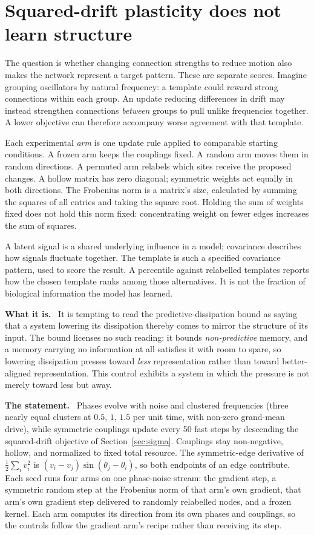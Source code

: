 \documentclass[11pt]{article}
\newcommand{\what}{\par\smallskip\noindent\textbf{What it is.}\ }
\newcommand{\statement}{\par\smallskip\noindent\textbf{The statement.}\ }
\begin{document}
\section{Squared-drift plasticity does not learn structure}
\label{sec:plasticity}

The question is whether changing connection strengths to reduce motion also
makes the network represent a target pattern. These are separate scores.
Imagine grouping oscillators by natural frequency: a template could reward
strong connections within each group. An update reducing differences in drift
may instead strengthen connections \emph{between} groups to pull unlike
frequencies together. A lower objective can therefore accompany worse
agreement with that template.

Each experimental \emph{arm} is one update rule applied to comparable starting
conditions. A frozen arm keeps the couplings fixed. A random arm moves them in
random directions. A permuted arm relabels which sites receive the proposed
changes. A hollow matrix has zero diagonal; symmetric weights act equally in
both directions. The Frobenius norm is a matrix's size, calculated by summing
the squares of all entries and taking the square root. Holding the sum of
weights fixed does not hold this norm fixed: concentrating weight on fewer
edges increases the sum of squares.

A latent signal is a shared underlying influence in a model; covariance
describes how signals fluctuate together. The template is such a specified
covariance pattern, used to score the result. A percentile against relabelled
templates reports how the chosen template ranks among those alternatives.
It is not the fraction of biological information the model has learned.

\what
It is tempting to read the predictive-dissipation bound as saying that a system
lowering its dissipation thereby comes to mirror the structure of its input.
The bound licenses no such reading: it bounds \emph{non-predictive} memory, and
a memory carrying no information at all satisfies it with room to spare, so
lowering dissipation presses toward \emph{less} representation rather than
toward better-aligned representation. This control exhibits a system in which
the pressure is not merely toward less but away.

\statement
Phases evolve with noise and clustered frequencies (three nearly equal clusters
at $0.5$, $1$, $1.5$ per unit time, with non-zero grand-mean drive), while
symmetric couplings update every 50 fast steps by descending the squared-drift
objective of Section~\ref{sec:sigma}. Couplings stay non-negative, hollow, and
normalized to fixed total resource. The symmetric-edge derivative of
$\tfrac12\sum_i v_i^2$ is $(v_i-v_j)\sin(\theta_j-\theta_i)$, so both endpoints
of an edge contribute. Each seed runs four arms on one phase-noise stream: the
gradient step, a symmetric random step at the Frobenius norm of that arm's own
gradient, that arm's own gradient step delivered to randomly relabelled nodes,
and a frozen kernel. Each arm computes its direction from its own phases and
couplings, so the controls follow the gradient arm's recipe rather than
receiving its step.
\end{document}
